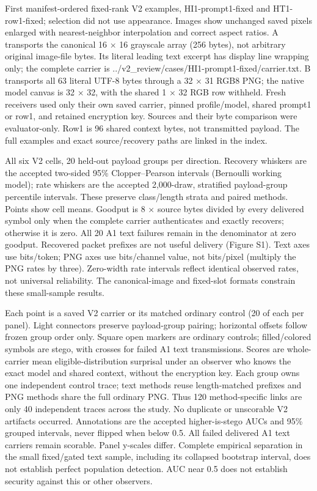 \caption{First manifest-ordered fixed-rank V2 examples, HI1-prompt1-fixed and HT1-row1-fixed; selection did not use appearance. Images show unchanged saved pixels enlarged with nearest-neighbor interpolation and correct aspect ratios. A transports the canonical 16 $\times$ 16 grayscale array (256 bytes), not arbitrary original image-file bytes. Its literal leading text excerpt has display line wrapping only; the complete carrier is ../v2\_review/cases/HI1-prompt1-fixed/carrier.txt. B transports all 63 literal UTF-8 bytes through a 32 $\times$ 31 RGB8 PNG; the native model canvas is 32 $\times$ 32, with the shared 1 $\times$ 32 RGB row withheld. Fresh receivers used only their own saved carrier, pinned profile/model, shared prompt1 or row1, and retained encryption key. Sources and their byte comparison were evaluator-only. Row1 is 96 shared context bytes, not transmitted payload. The full examples and exact source/recovery paths are linked in the index.}
\label{fig:figure1_transport}

\caption{All six V2 cells, 20 held-out payload groups per direction. Recovery whiskers are the accepted two-sided 95\% Clopper--Pearson intervals (Bernoulli working model); rate whiskers are the accepted 2,000-draw, stratified payload-group percentile intervals. These preserve class/length strata and paired methods. Points show cell means. Goodput is 8 $\times$ source bytes divided by every delivered symbol only when the complete carrier authenticates and exactly recovers; otherwise it is zero. All 20 A1 text failures remain in the denominator at zero goodput. Recovered packet prefixes are not useful delivery (Figure S1). Text axes use bits/token; PNG axes use bits/channel value, not bits/pixel (multiply the PNG rates by three). Zero-width rate intervals reflect identical observed rates, not universal reliability. The canonical-image and fixed-slot formats constrain these small-sample results.}
\label{fig:figure2_recovery_rate}

\caption{Each point is a saved V2 carrier or its matched ordinary control (20 of each per panel). Light connectors preserve payload-group pairing; horizontal offsets follow frozen group order only. Square open markers are ordinary controls; filled/colored symbols are stego, with crosses for failed A1 text transmissions. Scores are whole-carrier mean eligible-distribution surprisal under an observer who knows the exact model and shared context, without the encryption key. Each group owns one independent control trace; text methods reuse length-matched prefixes and PNG methods share the full ordinary PNG. Thus 120 method-specific links are only 40 independent traces across the study. No duplicate or unscorable V2 artifacts occurred. Annotations are the accepted higher-is-stego AUCs and 95\% grouped intervals, never flipped when below 0.5. All failed delivered A1 text carriers remain scorable. Panel y-scales differ. Complete empirical separation in the small fixed/gated text sample, including its collapsed bootstrap interval, does not establish perfect population detection. AUC near 0.5 does not establish security against this or other observers.}
\label{fig:figure3_detectability}

